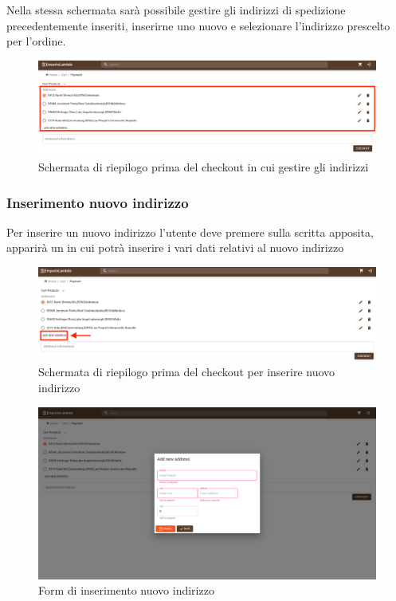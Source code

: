 Nella stessa schermata sarà possibile gestire gli indirizzi di spedizione precedentemente inseriti, inserirne uno nuovo e selezionare l'indirizzo prescelto per l'ordine.
\begin{figure}[H]
	\centering
	\includegraphics[scale=0.25]{Immagini/Acquirente/payment.customer.png}
	\caption{Schermata di riepilogo prima del checkout in cui gestire gli indirizzi}
	\label{fig:CartAddress}
\end{figure}
\subsubsection{Inserimento nuovo indirizzo}
Per inserire un nuovo indirizzo l'utente deve premere sulla scritta apposita, apparirà un  in cui potrà inserire i vari dati relativi al nuovo indirizzo
\begin{figure}[H]
	\centering
	\includegraphics[scale=0.25]{Immagini/Acquirente/payment.addressnew.png}
	\caption{Schermata di riepilogo prima del checkout per inserire nuovo indirizzo}
	\label{fig:NewAddress}
\end{figure}
\begin{figure}[H]
	\centering
	\includegraphics[scale=0.25]{Immagini/Acquirente/payment-new-address.customer.png}
	\caption{Form di inserimento nuovo indirizzo}
	\label{fig:CartnewAddress}
\end{figure}
